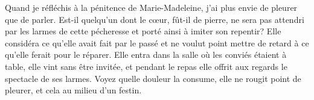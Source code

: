 Quand je réfléchis à la pénitence de Marie-Madeleine,
	j’ai plus envie de pleurer que de parler.
Est-il quelqu’un dont le cœur, fût-il de pierre,
	ne sera pas attendri par les larmes de cette pécheresse
	et porté ainsi à imiter son repentir?
Elle considéra ce qu’elle avait fait par le passé
	et ne voulut point mettre de retard à ce qu’elle ferait pour le réparer.
Elle entra dans la salle où les conviés étaient à table,
	elle vint sans être invitée,
	et pendant le repas elle offrit aux regards le spectacle de ses larmes.
Voyez quelle douleur la consume,
	elle ne rougit point de pleurer, et cela au milieu d’un festin.
